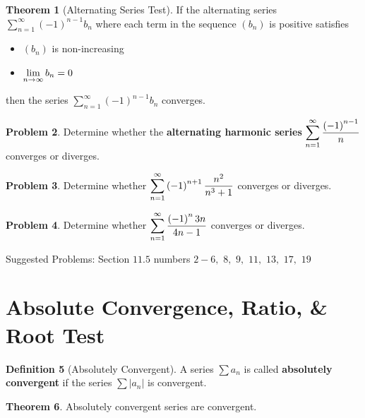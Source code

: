 \documentclass[letterpaper, twoside, 12pt]{book}
\theoremstyle{definition}
\newtheorem{theorem}{Theorem}
\theoremstyle{definition}
\newtheorem{definition}[theorem]{Definition}
\newtheorem{problem}[theorem]{Problem}
\newcommand{\ds}{\ensuremath{\displaystyle}}
\begin{document}
\begin{theorem}[Alternating Series Test]
 If the alternating series $\sum_{n=1}^{\infty} \left(-1\right)^{n-1} b_n$ where each term in the sequence $\left(b_n\right)$ is positive satisfies
 \begin{itemize}
  \item $\left(b_n\right)$ is non-increasing
  \item $\ds \lim_{n \rightarrow \infty} b_n = 0$
 \end{itemize}
 then the series $\sum_{n=1}^{\infty} \left(-1\right)^{n-1} b_n$ converges.
\end{theorem}

\begin{problem}
 Determine whether the \textbf{alternating harmonic series} $\ds \sum_{n=1}^{\infty} \frac{\left(-1\right)^{n-1}}{n}$ converges or diverges.
\end{problem}

\vfill

\begin{problem}
 Determine whether $\ds\sum_{n=1}^{\infty} \left(-1\right)^{n+1} \frac{n^2}{n^3+1}$ converges or diverges.
\end{problem}

\vfill

\begin{problem}
 Determine whether $\ds \sum_{n=1}^{\infty} \frac{\left(-1\right)^{n}3n}{4n-1}$ converges or diverges.
\end{problem}

\vfill

\noindent Suggested Problems: Section $11.5$ numbers $2 - 6,$ $8,$ $9,$ $11,$ $13,$ $17,$ $19$

\newpage

\section{Absolute Convergence, Ratio, \& Root Test}

\begin{definition}[Absolutely Convergent]
 A series $\sum a_n$ is called \textbf{absolutely convergent} if the series $\sum \left|a_n\right|$ is convergent.
\end{definition}

\begin{theorem}
  Absolutely convergent series are convergent.
\end{theorem}
\end{document}
